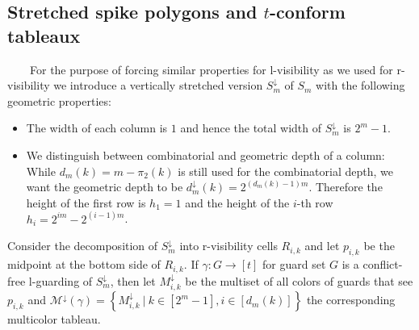 \documentclass[a4paper,USenglish,numberwithinsect]{lipics}
\theoremstyle{plain}
\begin{document}
\subsection{Stretched spike polygons and {\bf $t$}-conform tableaux}
\ \ \ \ For the purpose of forcing similar properties for l-visibility as we
used for r-visibility
we introduce a vertically stretched version ${S_m^{\downarrow}}$ of  $S_m$ with the
following geometric properties:
\begin{itemize}
\item The width of each column is $1$ and hence the total width of  
$S_m^{\downarrow}$ is
$2^m-1$.   
\item We  distinguish between combinatorial and geometric depth of a
column:
While  $d_m(k)=m-\pi_2(k)$ is still used for the combinatorial depth,  we
want  the  geometric depth to  be  $d^{\downarrow}_m(k)=
2^{(d_m(k)-1)m}$.
Therefore the height of the first row is $h_1=1$ and the height of
the $i$-th row  $h_i= 2^{im}-2^{(i-1)m}$.
\end{itemize}
Consider the decomposition of $S_m^{\downarrow}$ into r-visibility cells
$R_{i,k}$ and let
$p_{i,k}$ be the midpoint at the bottom side of  $R_{i,k}$.
If $\gamma:G \rightarrow [t]$ for guard set  $G $ is a  conflict-free l-guarding of
$S_m^{\downarrow}$, then
let $M_{i,k}^{\downarrow}$ be the multiset of all colors of guards that see
$p_{i,k}$ and ${\mathcal
M}^{\downarrow}(\gamma)=\left\{M_{i,k}^{\downarrow} \ | \ k \in [2^m-1], i
\in [d_m(k)] \right\}$
the corresponding multicolor tableau.
\end{document}

